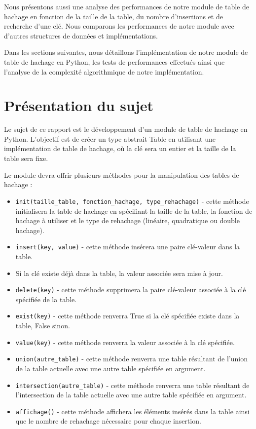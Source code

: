\documentclass{article}
\begin{document}
    Nous présentons aussi une analyse des performances de notre module de table de hachage en fonction de la taille de la table, du nombre d'insertions et de recherche d'une clé.
    Nous comparons les performances de notre module avec d'autres structures de données et implémentations.

    Dans les sections suivantes, nous détaillons l'implémentation de notre module de table de hachage en Python, les tests de performances effectués ainsi que l'analyse de la complexité algorithmique de notre implémentation.

    \newpage
    \section{Présentation du sujet}\label{sec:presentation}

    Le sujet de ce rapport est le développement d'un module de table de hachage en Python.
    L'objectif est de créer un type abstrait Table en utilisant une implémentation de table de hachage, où la clé sera un entier et la taille de la table sera fixe.

    Le module devra offrir plusieurs méthodes pour la manipulation des tables de hachage :
    \begin{itemize}
        \item \texttt{init(taille\_table, fonction\_hachage, type\_rehachage)} - cette méthode initialisera la table de hachage en spécifiant la taille de la table, la fonction de hachage à utiliser et le type de rehachage (linéaire, quadratique ou double hachage).
        \item \texttt{insert(key, value)} - cette méthode insérera une paire clé-valeur dans la table.
        \item Si la clé existe déjà dans la table, la valeur associée sera mise à jour.
        \item \texttt{delete(key)} - cette méthode supprimera la paire clé-valeur associée à la clé spécifiée de la table.
        \item \texttt{exist(key)} - cette méthode renverra True si la clé spécifiée existe dans la table, False sinon.
        \item \texttt{value(key)} - cette méthode renverra la valeur associée à la clé spécifiée.
        \item \texttt{union(autre\_table)} - cette méthode renverra une table résultant de l'union de la table actuelle avec une autre table spécifiée en argument.
        \item \texttt{intersection(autre\_table)} - cette méthode renverra une table résultant de l'intersection de la table actuelle avec une autre table spécifiée en argument.
        \item \texttt{affichage()} - cette méthode affichera les éléments insérés dans la table ainsi que le nombre de rehachage nécessaire pour chaque insertion.
    \end{itemize}
\end{document}
